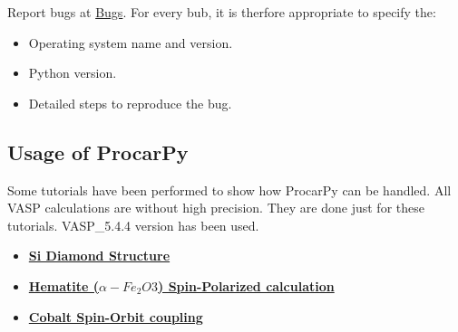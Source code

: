 \documentclass[11pt]{article}
\providecommand{\tightlist}{%
      \setlength{\itemsep}{0pt}\setlength{\parskip}{0pt}}
\begin{document}
Report bugs at \href{https://github.com/K4ys4r/ProcarPy/issues}{Bugs}.
For every bub, it is therfore appropriate to specify the:

\begin{itemize}
\tightlist
\item
  Operating system name and version.
\item
  Python version.
\item
  Detailed steps to reproduce the bug.
\end{itemize}

\subsection{Usage of ProcarPy}\label{usage-of-procarpy}

Some tutorials have been performed to show how ProcarPy can be handled.
All VASP calculations are without high precision. They are done just for
these tutorials. VASP\_5.4.4 version has been used.

\begin{itemize}
\tightlist
\item
  \href{https://github.com/K4ys4r/ProcarPy/blob/master/test/Si_diamond/Si_Diamond_Tutorial.ipynb}{\textbf{Si
  Diamond Structure}}
\item
  \href{https://github.com/K4ys4r/ProcarPy/blob/master/test/Fe2O3/Fe2O3_Tutorial.ipynb}{\textbf{Hematite
  (\(\alpha-Fe_2O3\)) Spin-Polarized calculation}}
\item
  \href{https://github.com/K4ys4r/ProcarPy/blob/master/test/Co/Co_Tutorial.ipynb}{\textbf{Cobalt
  Spin-Orbit coupling}}
\end{itemize}


    
    
    
    
\end{document}
